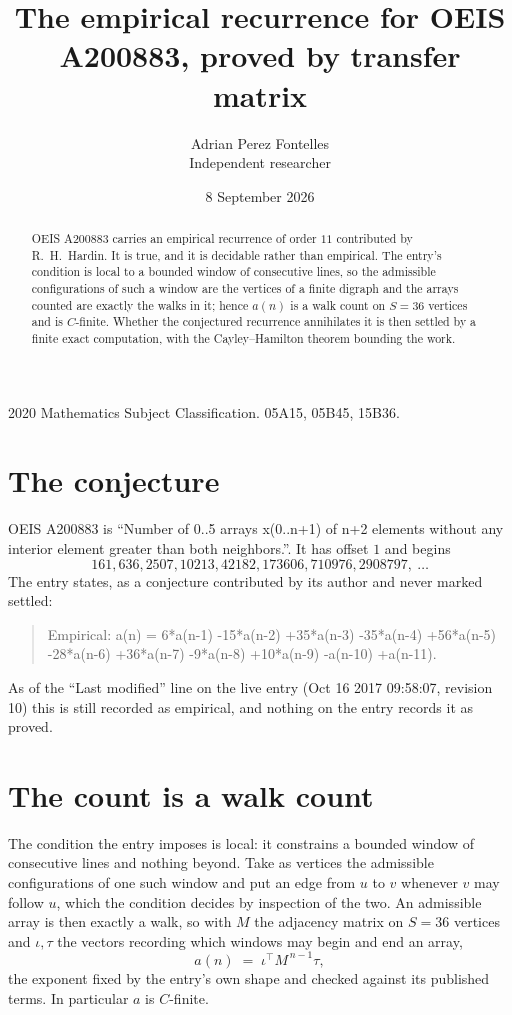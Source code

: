 \documentclass[11pt,a4paper]{article}
\title{The empirical recurrence for OEIS A200883, proved by transfer matrix}
\author{Adrian Perez Fontelles\\ \small Independent researcher}
\date{8 September 2026}
\theoremstyle{plain}
\theoremstyle{definition}
\begin{document}
\maketitle

\begin{abstract}
OEIS A200883 carries an empirical recurrence of order $11$ contributed by R.~H.~Hardin. It is
true, and it is decidable rather than empirical. The entry's condition is local to a bounded window of consecutive lines, so
the admissible configurations of such a window are the vertices of a finite digraph and the
arrays counted are exactly the walks in it; hence $a(n)$ is a walk count on $S=36$ vertices
and is $C$-finite. Whether the conjectured recurrence annihilates it is then settled by a
finite exact computation, with the Cayley--Hamilton theorem bounding the work.
\end{abstract}

\noindent\small 2020 Mathematics Subject Classification. 05A15, 05B45, 15B36.\normalsize

\section{The conjecture}

OEIS A200883 is ``Number of 0..5 arrays x(0..n+1) of n+2 elements without any interior element greater than both neighbors.''. It has offset $1$ and begins
\[
161, 636, 2507, 10213, 42182, 173606, 710976, 2908797,\ \dots
\]
The entry states, as a conjecture contributed by its author and never marked settled:
\begin{quote}
Empirical: a(n) = 6*a(n-1) -15*a(n-2) +35*a(n-3) -35*a(n-4) +56*a(n-5) -28*a(n-6) +36*a(n-7) -9*a(n-8) +10*a(n-9) -a(n-10) +a(n-11).
\end{quote}
As of the ``Last modified'' line on the live entry (Oct 16 2017 09:58:07, revision 10) this is still
recorded as empirical, and nothing on the entry records it as proved.

\section{The count is a walk count}

The condition the entry imposes is local: it constrains a bounded window of consecutive lines and nothing beyond. Take as
vertices the admissible configurations of one such window and put an edge from $u$ to $v$
whenever $v$ may follow $u$, which the condition decides by inspection of the two. An
admissible array is then exactly a walk, so with $M$ the adjacency matrix on $S=36$ vertices
and $\iota,\tau$ the vectors recording which windows may begin and end an array,
\[
a(n)\;=\;\iota^{\!\top}M^{\,n-1}\tau ,
\]
the exponent fixed by the entry's own shape and checked against its published terms. In
particular $a$ is $C$-finite.
\end{document}
